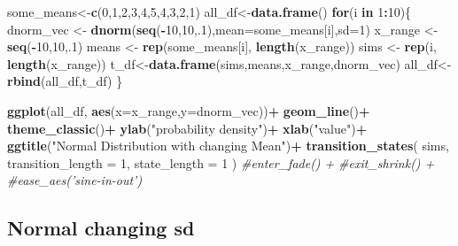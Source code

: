 \documentclass[
]{book}
\newenvironment{Shaded}{\begin{snugshade}}{\end{snugshade}}
\newcommand{\CommentTok}[1]{\textcolor[rgb]{0.56,0.35,0.01}{\textit{#1}}}
\newcommand{\ControlFlowTok}[1]{\textcolor[rgb]{0.13,0.29,0.53}{\textbf{#1}}}
\newcommand{\DataTypeTok}[1]{\textcolor[rgb]{0.13,0.29,0.53}{#1}}
\newcommand{\DecValTok}[1]{\textcolor[rgb]{0.00,0.00,0.81}{#1}}
\newcommand{\KeywordTok}[1]{\textcolor[rgb]{0.13,0.29,0.53}{\textbf{#1}}}
\newcommand{\NormalTok}[1]{#1}
\newcommand{\OperatorTok}[1]{\textcolor[rgb]{0.81,0.36,0.00}{\textbf{#1}}}
\newcommand{\StringTok}[1]{\textcolor[rgb]{0.31,0.60,0.02}{#1}}
\begin{document}
\begin{Shaded}
\begin{Highlighting}[]
\NormalTok{some_means<-}\KeywordTok{c}\NormalTok{(}\DecValTok{0}\NormalTok{,}\DecValTok{1}\NormalTok{,}\DecValTok{2}\NormalTok{,}\DecValTok{3}\NormalTok{,}\DecValTok{4}\NormalTok{,}\DecValTok{5}\NormalTok{,}\DecValTok{4}\NormalTok{,}\DecValTok{3}\NormalTok{,}\DecValTok{2}\NormalTok{,}\DecValTok{1}\NormalTok{)}
\NormalTok{all_df<-}\KeywordTok{data.frame}\NormalTok{()}
\ControlFlowTok{for}\NormalTok{(i }\ControlFlowTok{in} \DecValTok{1}\OperatorTok{:}\DecValTok{10}\NormalTok{)\{}
\NormalTok{  dnorm_vec <-}\StringTok{ }\KeywordTok{dnorm}\NormalTok{(}\KeywordTok{seq}\NormalTok{(}\OperatorTok{-}\DecValTok{10}\NormalTok{,}\DecValTok{10}\NormalTok{,.}\DecValTok{1}\NormalTok{),}\DataTypeTok{mean=}\NormalTok{some_means[i],}\DataTypeTok{sd=}\DecValTok{1}\NormalTok{)}
\NormalTok{  x_range   <-}\StringTok{ }\KeywordTok{seq}\NormalTok{(}\OperatorTok{-}\DecValTok{10}\NormalTok{,}\DecValTok{10}\NormalTok{,.}\DecValTok{1}\NormalTok{)}
\NormalTok{  means <-}\StringTok{ }\KeywordTok{rep}\NormalTok{(some_means[i], }\KeywordTok{length}\NormalTok{(x_range))}
\NormalTok{  sims <-}\StringTok{ }\KeywordTok{rep}\NormalTok{(i, }\KeywordTok{length}\NormalTok{(x_range))}
\NormalTok{  t_df<-}\KeywordTok{data.frame}\NormalTok{(sims,means,x_range,dnorm_vec)}
\NormalTok{  all_df<-}\KeywordTok{rbind}\NormalTok{(all_df,t_df)}
\NormalTok{\}}

\KeywordTok{ggplot}\NormalTok{(all_df, }\KeywordTok{aes}\NormalTok{(}\DataTypeTok{x=}\NormalTok{x_range,}\DataTypeTok{y=}\NormalTok{dnorm_vec))}\OperatorTok{+}
\StringTok{  }\KeywordTok{geom_line}\NormalTok{()}\OperatorTok{+}
\StringTok{  }\KeywordTok{theme_classic}\NormalTok{()}\OperatorTok{+}
\StringTok{  }\KeywordTok{ylab}\NormalTok{(}\StringTok{"probability density"}\NormalTok{)}\OperatorTok{+}
\StringTok{  }\KeywordTok{xlab}\NormalTok{(}\StringTok{"value"}\NormalTok{)}\OperatorTok{+}
\StringTok{  }\KeywordTok{ggtitle}\NormalTok{(}\StringTok{"Normal Distribution with changing Mean"}\NormalTok{)}\OperatorTok{+}
\StringTok{   }\KeywordTok{transition_states}\NormalTok{(}
\NormalTok{    sims,}
    \DataTypeTok{transition_length =} \DecValTok{1}\NormalTok{,}
    \DataTypeTok{state_length =} \DecValTok{1}
\NormalTok{  )}
  \CommentTok{#enter_fade() + }
  \CommentTok{#exit_shrink() +}
  \CommentTok{#ease_aes('sine-in-out')}
\end{Highlighting}
\end{Shaded}

\hypertarget{normal-changing-sd}{%
\subsection{Normal changing sd}\label{normal-changing-sd}}
\end{document}
